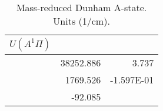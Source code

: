 \begin{table}[h]
\begin{tabular}{crr}
\toprule
$U (A^1\Pi)$\\ \midrule 
& 38252.886 & 3.737 \\
& 1769.526 & -1.597E-01 \\
& -92.085 \\
\bottomrule
\end{tabular}\caption{Mass-reduced Dunham A-state. Units (1/cm).}\end{table}
